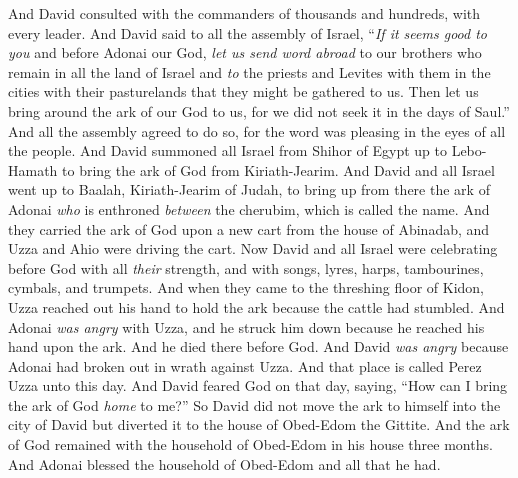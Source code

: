 \begin{biblechapter} %
 And David consulted with the commanders of thousands and hundreds, with every leader.
\verse And David said to all the assembly of Israel, “\textit{If it seems good to you} and before Adonai our God, \textit{let us send word abroad} to our brothers who remain in all the land of Israel and \textit{to} the priests and Levites with them in the cities with their pasturelands that they might be gathered to us.
\verse Then let us bring around the ark of our God to us, for we did not seek it in the days of Saul.”
\verse And all the assembly agreed to do so, for the word was pleasing in the eyes of all the people.
\verse And David summoned all Israel from Shihor of Egypt up to Lebo-Hamath to bring the ark of God from Kiriath-Jearim.
\verse And David and all Israel went up to Baalah, Kiriath-Jearim of Judah, to bring up from there the ark of Adonai \textit{who} is enthroned \textit{between} the cherubim, which is called the name.
\verse And they carried the ark of God upon a new cart from the house of Abinadab, and Uzza and Ahio were driving the cart.
\verse Now David and all Israel were celebrating before God with all \textit{their} strength, and with songs, lyres, harps, tambourines, cymbals, and trumpets.
\verse And when they came to the threshing floor of Kidon, Uzza reached out his hand to hold the ark because the cattle had stumbled.
\verse And Adonai \textit{was angry} with Uzza, and he struck him down because he reached his hand upon the ark. And he died there before God.
\verse And David \textit{was angry} because Adonai had broken out in wrath against Uzza. And that place is called Perez Uzza unto this day.
\verse And David feared God on that day, saying, “How can I bring the ark of God \textit{home} to me?”
\verse So David did not move the ark to himself into the city of David but diverted it to the house of Obed-Edom the Gittite.
\verse And the ark of God remained with the household of Obed-Edom in his house three months. And Adonai blessed the household of Obed-Edom and all that he had.
\end{biblechapter}

